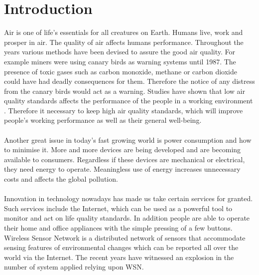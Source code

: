 \documentclass[12pt,a4paper,draft]{report}
\begin{document}
\chapter{Introduction}
%
Air is one of life's essentials for all creatures on Earth. Humans live, work and prosper in air. The quality of air affects humans performance. Throughout the years various methods have been devised to assure the good air quality. For example miners were using canary birds as warning systems until 1987. The presence of toxic gases such as carbon monoxide, methane or carbon dioxide could have had deadly consequences for them. Therefore the notice of any distress from the canary birds would act as a warning. Studies have shown that low air quality standards affects the performance of the people in a working environment \cite{airquality}. Therefore it necessary to keep high air quality standards, which will improve people's working performance as well as their general well-being.\\
\ \\
Another great issue in today's fast growing world is power consumption and how to minimise it. More and more devices are being developed and are becoming available to consumers. Regardless if these devices are mechanical or electrical, they need energy to operate. Meaningless use of energy increases unnecessary costs and affects the global pollution.\\
\ \\
Innovation in technology nowadays has made us take certain services for granted. Such services include the Internet, which can be used as a powerful tool to monitor and act on life quality standards. In addition people are able to operate their home and office appliances with the simple pressing of a few buttons. Wireless Sensor Network is a distributed network of sensors that accommodate sensing features of environmental changes which can be reported all over the world via the Internet. The recent years have witnessed an explosion in the number of system applied relying upon WSN.\\
\ \\
\end{document}
